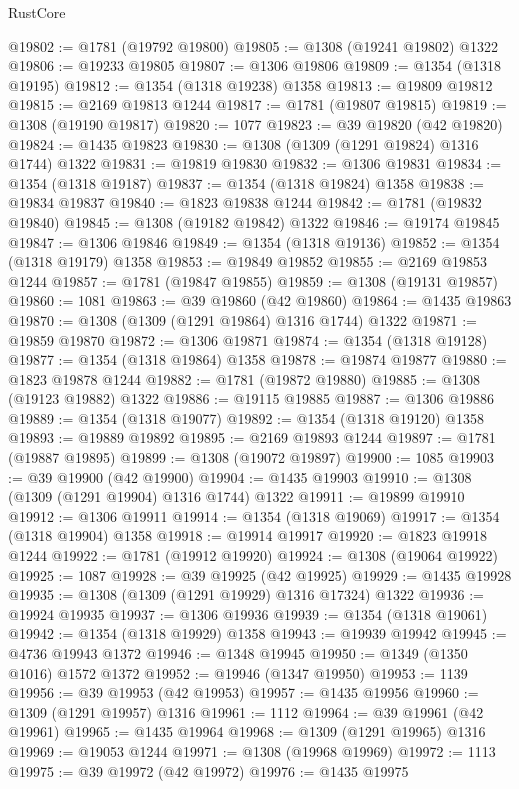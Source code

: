 \begin{lexlean}{RustCore}
\begin{coremodule}
@19802 := @1781 (@19792 @19800)
@19805 := @1308 (@19241 @19802) @1322
@19806 := @19233 @19805
@19807 := @1306 @19806
@19809 := @1354 (@1318 @19195)
@19812 := @1354 (@1318 @19238) @1358
@19813 := @19809 @19812
@19815 := @2169 @19813 @1244
@19817 := @1781 (@19807 @19815)
@19819 := @1308 (@19190 @19817)
@19820 := 1077
@19823 := @39 @19820 (@42 @19820)
@19824 := @1435 @19823
@19830 := @1308 (@1309 (@1291 @19824) @1316 @1744) @1322
@19831 := @19819 @19830
@19832 := @1306 @19831
@19834 := @1354 (@1318 @19187)
@19837 := @1354 (@1318 @19824) @1358
@19838 := @19834 @19837
@19840 := @1823 @19838 @1244
@19842 := @1781 (@19832 @19840)
@19845 := @1308 (@19182 @19842) @1322
@19846 := @19174 @19845
@19847 := @1306 @19846
@19849 := @1354 (@1318 @19136)
@19852 := @1354 (@1318 @19179) @1358
@19853 := @19849 @19852
@19855 := @2169 @19853 @1244
@19857 := @1781 (@19847 @19855)
@19859 := @1308 (@19131 @19857)
@19860 := 1081
@19863 := @39 @19860 (@42 @19860)
@19864 := @1435 @19863
@19870 := @1308 (@1309 (@1291 @19864) @1316 @1744) @1322
@19871 := @19859 @19870
@19872 := @1306 @19871
@19874 := @1354 (@1318 @19128)
@19877 := @1354 (@1318 @19864) @1358
@19878 := @19874 @19877
@19880 := @1823 @19878 @1244
@19882 := @1781 (@19872 @19880)
@19885 := @1308 (@19123 @19882) @1322
@19886 := @19115 @19885
@19887 := @1306 @19886
@19889 := @1354 (@1318 @19077)
@19892 := @1354 (@1318 @19120) @1358
@19893 := @19889 @19892
@19895 := @2169 @19893 @1244
@19897 := @1781 (@19887 @19895)
@19899 := @1308 (@19072 @19897)
@19900 := 1085
@19903 := @39 @19900 (@42 @19900)
@19904 := @1435 @19903
@19910 := @1308 (@1309 (@1291 @19904) @1316 @1744) @1322
@19911 := @19899 @19910
@19912 := @1306 @19911
@19914 := @1354 (@1318 @19069)
@19917 := @1354 (@1318 @19904) @1358
@19918 := @19914 @19917
@19920 := @1823 @19918 @1244
@19922 := @1781 (@19912 @19920)
@19924 := @1308 (@19064 @19922)
@19925 := 1087
@19928 := @39 @19925 (@42 @19925)
@19929 := @1435 @19928
@19935 := @1308 (@1309 (@1291 @19929) @1316 @17324) @1322
@19936 := @19924 @19935
@19937 := @1306 @19936
@19939 := @1354 (@1318 @19061)
@19942 := @1354 (@1318 @19929) @1358
@19943 := @19939 @19942
@19945 := @4736 @19943 @1372
@19946 := @1348 @19945
@19950 := @1349 (@1350 @1016) @1572 @1372
@19952 := @19946 (@1347 @19950)
@19953 := 1139
@19956 := @39 @19953 (@42 @19953)
@19957 := @1435 @19956
@19960 := @1309 (@1291 @19957) @1316
@19961 := 1112
@19964 := @39 @19961 (@42 @19961)
@19965 := @1435 @19964
@19968 := @1309 (@1291 @19965) @1316
@19969 := @19053 @1244
@19971 := @1308 (@19968 @19969)
@19972 := 1113
@19975 := @39 @19972 (@42 @19972)
@19976 := @1435 @19975

\end{coremodule}
\end{lexlean}
